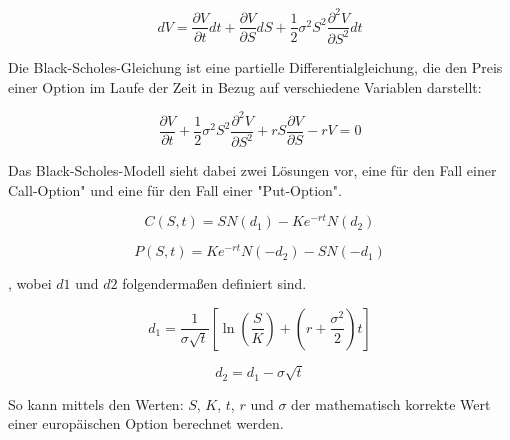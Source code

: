 \begin{equation}
	dV = \frac{\partial{V}}{\partial{t}} dt + \frac{\partial{V}}{\partial{S}} dS+ \frac{1}{2} \sigma^2 S^2 \frac{\partial^2{V}}{\partial{S^2}} dt
\end{equation}





Die Black-Scholes-Gleichung ist eine partielle Differentialgleichung, die den Preis einer Option im Laufe der Zeit in Bezug auf verschiedene Variablen darstellt:


\begin{equation}
	\frac{\partial V}{\partial t} + \frac{1}{2} \sigma^2 S^2 \frac{\partial^2 V}{\partial S^2} + rS \frac{\partial V}{\partial S} - rV = 0
\end{equation}

Das Black-Scholes-Modell sieht dabei zwei Lösungen vor, eine für den Fall einer Call-Option" und eine für den Fall einer "Put-Option".

\begin{equation}
	C(S, t) = SN(d_1) - Ke^{-rt}N(d_2)
\end{equation}

\begin{equation}
	P(S, t) = Ke^{-rt}N(-d_2) - SN(-d_1)
\end{equation}

, wobei $ d1 $ und $ d2 $ folgendermaßen definiert sind.

\begin{equation}
	d_1 = \frac{1}{\sigma \sqrt{t}} \left[\ln\left(\frac{S}{K}\right) + \left(r + \frac{\sigma^2}{2}\right)t\right]
\end{equation}

\begin{equation}
	d_2 = d_1 - \sigma \sqrt{t}
\end{equation}

So kann mittels den Werten: $ S $, $ K $, $ t $, $ r $ und $ \sigma $ der mathematisch korrekte Wert einer europäischen Option berechnet werden. 